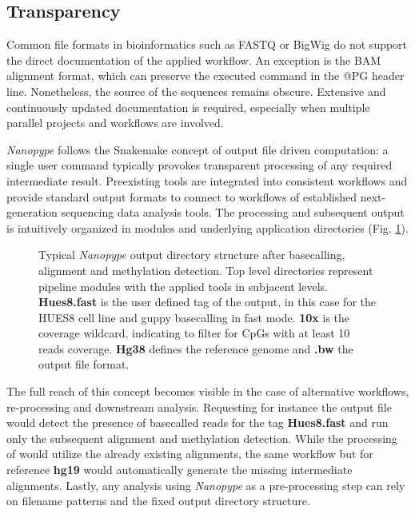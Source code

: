 \subsection{Transparency}
\label{subsec:nanopype:transparency}

Common file formats in bioinformatics such as FASTQ or BigWig do not support the direct documentation of the applied workflow. An exception is the BAM alignment format, which can preserve the executed command in the @PG header line. Nonetheless, the source of the sequences remains obscure. Extensive and continuously updated documentation is required, especially when multiple parallel projects and workflows are involved.

\textit{Nanopype} follows the Snakemake concept of output file driven computation: a single user command typically provokes transparent processing of any required intermediate result. Preexisting tools are integrated into consistent workflows and provide standard output formats to connect to workflows of established next-generation sequencing data analysis tools. The processing and subsequent output is intuitively organized in modules and underlying application directories (Fig. \ref{fig:nanopype:dir_tree}).

\begin{figure}[h]
	\centering
	\begin{minipage}{.7\linewidth}
	\end{minipage}
	\captionsetup{format=plain}
	\caption[Typical Nanopype output directory]{Typical \textit{Nanopype} output directory structure after basecalling, alignment and methylation detection. Top level directories represent pipeline modules with the applied tools in subjacent levels. \textbf{Hues8.fast} is the user defined tag of the output, in this case for the HUES8 cell line and guppy basecalling in fast mode. \textbf{10x} is the coverage wildcard, indicating to filter for CpGs with at least 10 reads coverage. \textbf{Hg38} defines the reference genome and \textbf{.bw} the output file format.}
	\label{fig:nanopype:dir_tree}
\end{figure}

The full reach of this concept becomes visible in the case of alternative workflows, re-processing and downstream analysis. Requesting for instance the output file  would detect the presence of basecalled reads for the tag \textbf{Hues8.fast} and run only the subsequent alignment and methylation detection. While the processing of  would utilize the already existing alignments, the same workflow but for reference \textbf{hg19} would automatically generate the missing intermediate alignments.
Lastly, any analysis using \textit{Nanopype} as a pre-processing step can rely on filename patterns and the fixed output directory structure.




